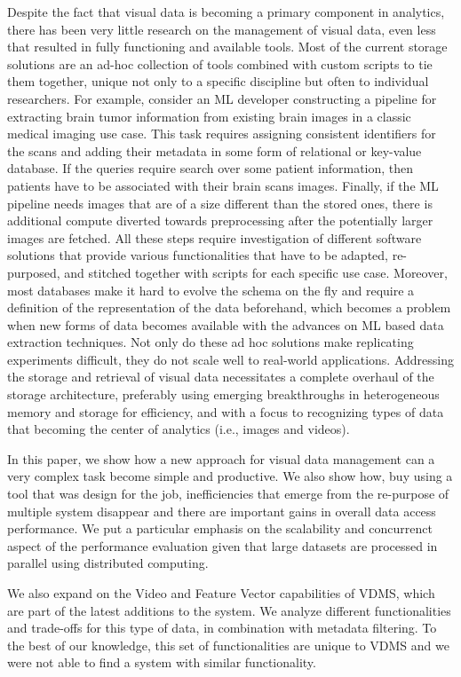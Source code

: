 Despite the fact that visual data is becoming a primary component in analytics,
there has been very little research on the management of visual data, even
less that resulted in fully functioning and available tools.
Most of the current storage solutions are an ad-hoc collection of
tools combined with custom scripts to tie them together, unique not only to
a specific discipline but often to individual researchers.
For example, consider an ML developer constructing a pipeline
for extracting brain tumor information from existing brain images in a
classic medical imaging use case. This task requires assigning consistent
identifiers for the scans and adding their metadata in
some form of relational or key-value database.
If the queries require search over some patient information,
then patients have to be associated with their brain scans images.
Finally, if the ML pipeline needs images that are of a size different
than the stored ones, there is additional compute diverted
towards preprocessing after the potentially larger images are fetched.
All these steps require investigation of different software
solutions that provide various functionalities that have to be adapted,
re-purposed, and stitched together with scripts for each specific use case.
Moreover, most databases make it hard to evolve the schema on the fly and
require a definition of the representation of the data beforehand, which becomes
a problem when new forms of data becomes available with the advances on ML based
data extraction techniques.
Not only do these ad hoc solutions make replicating experiments
difficult, they do not scale well to real-world applications.
Addressing the storage and retrieval of visual data necessitates a complete
overhaul of the storage architecture, preferably using emerging breakthroughs in
heterogeneous memory and storage for efficiency, and with a focus to recognizing
types of data that becoming the center of analytics (i.e., images and videos).

In this paper, we show how a new approach for visual data management can
a very complex task become simple and productive.
We also show how, buy using a tool that was design for the job,
inefficiencies that emerge from the re-purpose of multiple system disappear
and there are important gains in overall data access performance.
We put a particular emphasis on the scalability and concurrenct aspect of the
performance evaluation given that large datasets are processed in parallel
using distributed computing.

We also expand on the Video and Feature Vector capabilities of
VDMS, which are part of the latest additions to the system.
We analyze different functionalities and trade-offs for this type of data,
in combination with metadata filtering.
To the best of our knowledge, this set of functionalities are unique to
VDMS and we were not able to find a system with similar functionality.

